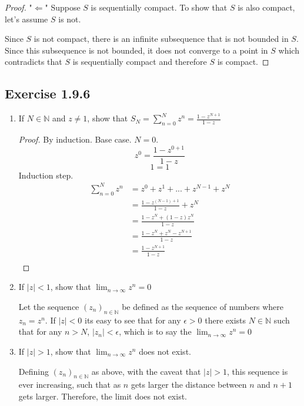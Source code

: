 \documentclass{tufte-book}
\theoremstyle{mytheoremstyle}
\theoremstyle{mylemstyle}
\theoremstyle{mydefstyle}
\begin{document}
\begin{proof}"$\Leftarrow$"
Suppose $S$ is sequentially compact. To show that $S$ is also compact, let's assume $S$ is not.

Since $S$ is not compact, there is an infinite subsequence that is not bounded in $S$.  Since this subsequence is not bounded, it does not converge to a point in $S$ which contradicts that $S$ is sequentially compact and therefore $S$ is compact.
\end{proof}

\subsection{Exercise 1.9.6}
\begin{enumerate}

\item If $N \in \mathbb{N}$ and $z \neq 1$, show that $S_N = \sum_{n=0}^{N}z^n = \frac{1-z^{N+1}}{1-z}$

\begin{proof}By induction.
Base case. $N=0$.
\[z^0 = \frac{1-z^{0+1}}{1-z}\]
\[1 = 1\]
Induction step.  
\begin{align*}
\sum_{n=0}^{N}z^n &= z^0+z^1+...+z^{N-1} + z^{N}\\
 &= \frac{1-z^{(N-1)+1}}{1-z} + z^{N}\\
 &= \frac{1-z^{N} + (1-z)z^{N}}{1-z}\\
 &= \frac{1-z^{N} + z^{N} - z^{N+1}}{1-z}\\
 &= \frac{1-z^{N+1}}{1-z}\\
\end{align*}
\end{proof}

\item If $|z| < 1$, show that $\lim_{n \rightarrow \infty}z^n =0$

Let the sequence $(z_n)_{n \in \mathbb{N}}$ be defined as the sequence of numbers where $z_n = z^n$.  If $|z| < 0$ its easy to see that for any $\epsilon > 0$ there exists $N \in \mathbb{N}$ such that for any $n > N$, $|z_n| < \epsilon$, which is to say the $\lim_{n \rightarrow \infty}z^n =0$

\item If $|z| > 1$, show that $\lim_{n \rightarrow \infty}z^n$ does not exist.

Defining $(z_n)_{n \in \mathbb{N}}$ as above, with the caveat that $|z| > 1$, this sequence is ever increasing, such that as $n$ gets larger the distance between $n$ and $n+1$ gets larger.  Therefore, the limit does not exist.

\end{enumerate}
\end{document}
